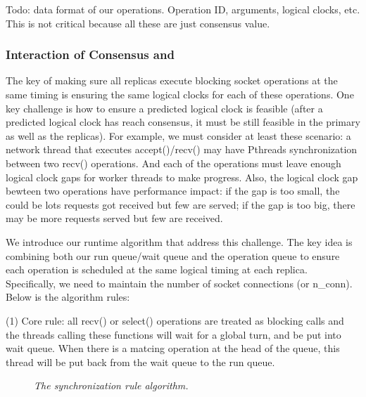 Todo: data format of our operations. Operation ID, arguments, logical clocks, 
etc. This is not critical because all these are just \paxos consensus value.

\subsubsection{Interaction of Consensus and \smt} \label{sec:rep-interface}

The key of making sure all replicas execute blocking socket operations at the 
same timing is ensuring the same logical clocks for each of these operations. 
One key challenge is how to ensure a predicted logical clock is 
feasible (\ie after a predicted logical clock has reach consensus, it must be 
still feasible in the primary as well as the replicas). For example, we must 
consider at least these scenario: a network thread that executes 
accept()/recv() may have Pthreads synchronization between two recv() operations.
And each of the \paxos operations must leave enough logical clock gaps for 
worker threads to make progress. Also, the logical clock gap bewteen two \paxos 
operations have performance impact: if the gap is too small, the could be lots 
requests got received but few are served; if the gap is too big, there may be 
more requests served but few are received.

We introduce our runtime algorithm that address this challenge. The key idea is 
combining both our \smt run queue/wait queue and the \paxos operation queue to 
ensure each \paxos operation is scheduled at the same logical timing at each 
replica. Specifically, we need to maintain %
the number of socket connections (or n\_conn). Below is the 
algorithm rules:

(1) Core rule: all recv() or select() operations are treated as blocking calls and the 
threads calling these functions will wait for a global \smt turn, and be put into wait 
queue. When there is a matcing \paxos operation at the head of the \paxos 
queue, this thread will be put back from the wait queue to the run queue.

\begin{figure}[t]
\centering
\begin{minipage}{.5\textwidth}
\end{minipage}
\vspace{-.1in}
\caption{{\em The synchronization rule algorithm.}} \label{fig:msmr-wait-rule}
\vspace{-.05in}
\end{figure}

